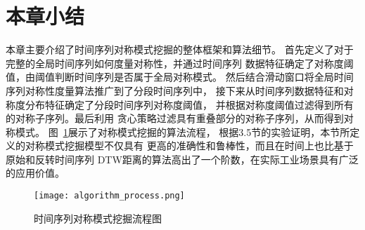 \section{本章小结}
本章主要介绍了时间序列对称模式挖掘的整体框架和算法细节。
首先定义了对于完整的全局时间序列如何度量对称性，并通过时间序列
数据特征确定了对称度阈值，由阈值判断时间序列是否属于全局对称模式。
然后结合滑动窗口将全局时间序列对称性度量算法推广到了分段时间序列中，
接下来从时间序列数据特征和对称度分布特征确定了分段时间序列对称度阈值，
并根据对称度阈值过滤得到所有的对称子序列。最后利用
贪心策略过滤具有重叠部分的对称子序列，从而得到对称模式。
图~\ref{fig:algorithm_process}展示了对称模式挖掘的算法流程，
根据3.5节的实验证明，本节所定义的对称模式挖掘模型不仅具有
更高的准确性和鲁棒性，而且在时间上也比基于原始和反转时间序列
DTW距离的算法高出了一个阶数，在实际工业场景具有广泛的应用价值。
\begin{figure}[h]
  \centering
  \texttt{[image: algorithm\_process.png]}
  \caption{时间序列对称模式挖掘流程图}
  \label{fig:algorithm_process}
\end{figure}